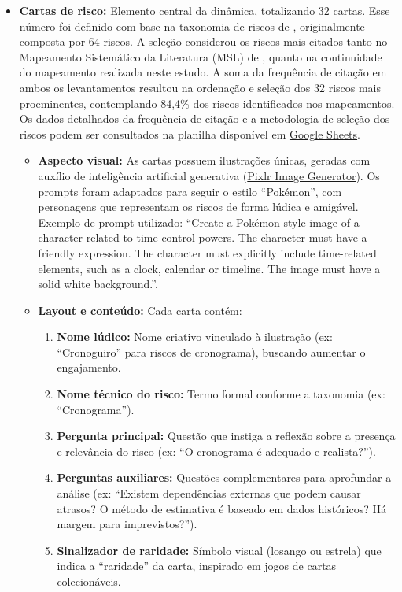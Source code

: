 \documentclass[
	12pt,
	openright,
	twoside,
	a4paper,
	english,
	brazil
	]{abntex2}
\begin{document}
\begin{itemize}
  \item \textbf{Cartas de risco:} Elemento central da dinâmica, totalizando 32 cartas. Esse número foi definido com base na taxonomia de riscos de \cite{Taxonomy}, originalmente composta por 64 riscos. A seleção considerou os riscos mais citados tanto no Mapeamento Sistemático da Literatura (MSL) de , quanto na continuidade do mapeamento realizada neste estudo. A soma da frequência de citação em ambos os levantamentos resultou na ordenação e seleção dos 32 riscos mais proeminentes, contemplando 84,4\% dos riscos identificados nos mapeamentos. Os dados detalhados da frequência de citação e a metodologia de seleção dos riscos podem ser consultados na planilha disponível em \href{https://docs.google.com/spreadsheets/d/1eAkx4HNaHIKhkq774zI2VREVNmeKtol5uXiC7Jg-0Sc/edit?usp=sharing}{Google Sheets}.
  \begin{itemize}
    \item \textbf{Aspecto visual:} As cartas possuem ilustrações únicas, geradas com auxílio de inteligência artificial generativa (\href{https://pixlr.com/br/image-generator/}{Pixlr Image Generator}). Os prompts foram adaptados para seguir o estilo “Pokémon”, com personagens que representam os riscos de forma lúdica e amigável. Exemplo de prompt utilizado: “Create a Pokémon-style image of a character related to time control powers. The character must have a friendly expression. The character must explicitly include time-related elements, such as a clock, calendar or timeline. The image must have a solid white background.”.
    
    \item \textbf{Layout e conteúdo:} Cada carta contém:
    \begin{enumerate}
      \item \textbf{Nome lúdico:} Nome criativo vinculado à ilustração (ex: “Cronoguiro” para riscos de cronograma), buscando aumentar o engajamento.
      \item \textbf{Nome técnico do risco:} Termo formal conforme a taxonomia (ex: “Cronograma”).
      \item \textbf{Pergunta principal:} Questão que instiga a reflexão sobre a presença e relevância do risco (ex: “O cronograma é adequado e realista?”).
      \item \textbf{Perguntas auxiliares:} Questões complementares para aprofundar a análise (ex: “Existem dependências externas que podem causar atrasos? O método de estimativa é baseado em dados históricos? Há margem para imprevistos?”).
      \item \textbf{Sinalizador de raridade:} Símbolo visual (losango ou estrela) que indica a “raridade” da carta, inspirado em jogos de cartas colecionáveis.
    \end{enumerate}
    

\end{itemize}
\end{itemize}
\end{document}

